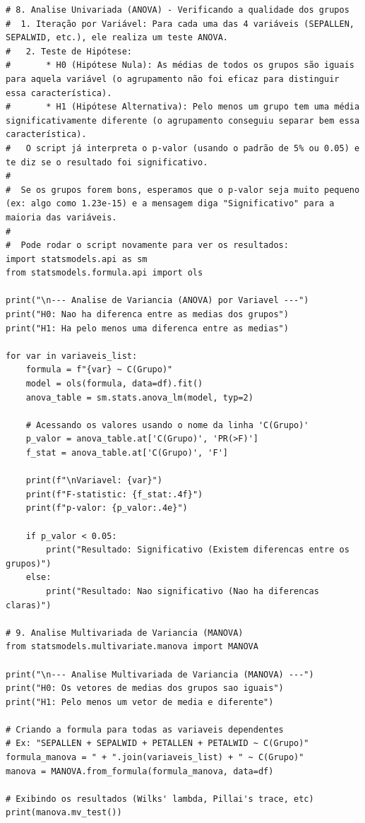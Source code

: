 \documentclass[11pt]{article}
\begin{document}
\begin{verbatim}
# 8. Analise Univariada (ANOVA) - Verificando a qualidade dos grupos
#  1. Iteração por Variável: Para cada uma das 4 variáveis (SEPALLEN, SEPALWID, etc.), ele realiza um teste ANOVA.
#   2. Teste de Hipótese:
#       * H0 (Hipótese Nula): As médias de todos os grupos são iguais para aquela variável (o agrupamento não foi eficaz para distinguir essa característica).
#       * H1 (Hipótese Alternativa): Pelo menos um grupo tem uma média significativamente diferente (o agrupamento conseguiu separar bem essa característica).
#   O script já interpreta o p-valor (usando o padrão de 5% ou 0.05) e te diz se o resultado foi significativo.
#
#  Se os grupos forem bons, esperamos que o p-valor seja muito pequeno (ex: algo como 1.23e-15) e a mensagem diga "Significativo" para a maioria das variáveis.
#
#  Pode rodar o script novamente para ver os resultados:
import statsmodels.api as sm
from statsmodels.formula.api import ols

print("\n--- Analise de Variancia (ANOVA) por Variavel ---")
print("H0: Nao ha diferenca entre as medias dos grupos")
print("H1: Ha pelo menos uma diferenca entre as medias")

for var in variaveis_list:
    formula = f"{var} ~ C(Grupo)"
    model = ols(formula, data=df).fit()
    anova_table = sm.stats.anova_lm(model, typ=2)
    
    # Acessando os valores usando o nome da linha 'C(Grupo)'
    p_valor = anova_table.at['C(Grupo)', 'PR(>F)']
    f_stat = anova_table.at['C(Grupo)', 'F']
    
    print(f"\nVariavel: {var}")
    print(f"F-statistic: {f_stat:.4f}")
    print(f"p-valor: {p_valor:.4e}")
    
    if p_valor < 0.05:
        print("Resultado: Significativo (Existem diferencas entre os grupos)")
    else:
        print("Resultado: Nao significativo (Nao ha diferencas claras)")

# 9. Analise Multivariada de Variancia (MANOVA)
from statsmodels.multivariate.manova import MANOVA

print("\n--- Analise Multivariada de Variancia (MANOVA) ---")
print("H0: Os vetores de medias dos grupos sao iguais")
print("H1: Pelo menos um vetor de media e diferente")

# Criando a formula para todas as variaveis dependentes
# Ex: "SEPALLEN + SEPALWID + PETALLEN + PETALWID ~ C(Grupo)"
formula_manova = " + ".join(variaveis_list) + " ~ C(Grupo)"
manova = MANOVA.from_formula(formula_manova, data=df)

# Exibindo os resultados (Wilks' lambda, Pillai's trace, etc)
print(manova.mv_test())


\end{verbatim}
\end{document}
